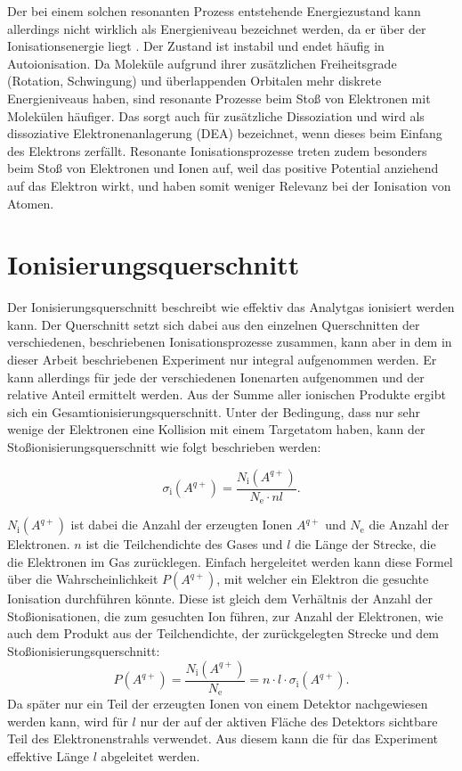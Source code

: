 Der bei einem solchen resonanten Prozess entstehende Energiezustand kann allerdings nicht wirklich als Energieniveau bezeichnet werden, da er über der Ionisationsenergie liegt \cite{EII}. Der Zustand ist instabil und endet häufig in Autoionisation. Da Moleküle aufgrund ihrer zusätzlichen Freiheitsgrade (Rotation, Schwingung) und überlappenden Orbitalen mehr diskrete Energieniveaus haben, sind resonante Prozesse beim Stoß von Elektronen mit Molekülen häufiger. Das sorgt auch für zusätzliche Dissoziation und wird als dissoziative Elektronenanlagerung (DEA) bezeichnet, wenn dieses beim Einfang des Elektrons zerfällt. Resonante Ionisationsprozesse treten zudem besonders beim Stoß von Elektronen und Ionen auf, weil das positive Potential anziehend auf das Elektron wirkt, und haben somit weniger Relevanz bei der Ionisation von Atomen.

\section{Ionisierungsquerschnitt}
Der Ionisierungsquerschnitt beschreibt wie effektiv das Analytgas ionisiert werden kann. Der Querschnitt setzt sich dabei aus den einzelnen Querschnitten der verschiedenen, beschriebenen Ionisationsprozesse zusammen, kann aber in dem in dieser Arbeit beschriebenen Experiment nur integral aufgenommen werden. Er kann allerdings für jede der verschiedenen Ionenarten aufgenommen und der relative Anteil ermittelt werden. Aus der Summe aller ionischen Produkte ergibt sich ein Gesamtionisierungsquerschnitt. Unter der Bedingung, dass nur sehr wenige der Elektronen eine Kollision mit einem Targetatom haben, kann der Stoßionisierungsquerschnitt wie folgt beschrieben werden:

\begin{equation}
    \sigma_{\text{i}}(A^{q+}) = \frac{N_{\text{i}}(A^{q+})}{N_{\text{e}} \cdot n l}.
\end{equation}

$N_\mathrm{i}(A^{q+})$ ist dabei die Anzahl der erzeugten Ionen $A^{q+}$ und $N_\text{e}$ die Anzahl der Elektronen. $n$ ist die Teilchendichte des Gases und $l$ die Länge der Strecke, die die Elektronen im Gas zurücklegen. Einfach hergeleitet werden kann diese Formel über die Wahrscheinlichkeit $P(A^{q+})$, mit welcher ein Elektron die gesuchte Ionisation durchführen könnte. Diese ist gleich dem Verhältnis der Anzahl der Stoßionisationen, die zum gesuchten Ion führen, zur Anzahl der Elektronen, wie auch dem Produkt aus der Teilchendichte, der zurückgelegten Strecke und dem Stoßionisierungsquerschnitt: 
\begin{equation}
    P(A^{q+}) = \frac{N_{\text{i}}(A^{q+})}{N_{\text{e}}} = n \cdot l \cdot \sigma_{\text{i}}(A^{q+}).
\end{equation}
Da später nur ein Teil der erzeugten Ionen von einem Detektor nachgewiesen werden kann, wird für $l$ nur der auf der aktiven Fläche des Detektors sichtbare Teil des Elektronenstrahls verwendet. Aus diesem kann die für das Experiment effektive Länge $l$ abgeleitet werden.

